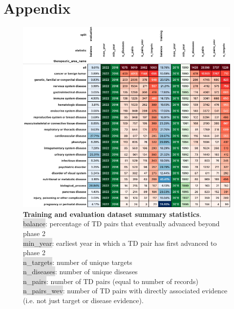\documentclass{article}
\begin{document}
\pagebreak

\section{Appendix}

\begin{figure}[H]
  \centering
  \captionsetup{width=.9\linewidth}
  \includegraphics[width=1\textwidth]{dataset_statistics.png}
  \caption{
    \textbf{Training and evaluation dataset summary statistics}.\\\hspace{\textwidth}
    \colorbox{Gainsboro}{balance}: percentage of TD pairs that eventually advanced beyond phase 2 \\\hspace{\textwidth} 
    \colorbox{Gainsboro}{min\_year}: earliest year in which a TD pair has first advanced to phase 2 \\\hspace{\textwidth} 
    \colorbox{Gainsboro}{n\_targets}: number of unique targets \\\hspace{\textwidth} 
    \colorbox{Gainsboro}{n\_diseases}: number of unique diseases \\\hspace{\textwidth} 
    \colorbox{Gainsboro}{n\_pairs}: number of TD pairs (equal to number of records) \\\hspace{\textwidth} 
    \colorbox{Gainsboro}{n\_pairs\_wev}: number of TD pairs with directly associated evidence (i.e. not just target or disease evidence).
  }
  \label{fig:dataset_statistics}
\end{figure}
\end{document}
